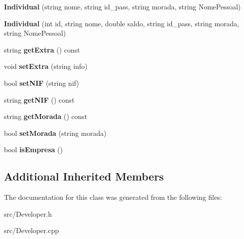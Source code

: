\begin{DoxyCompactItemize}
\item 
\hypertarget{class_individual_abb6c669a8218f6fc95d985f2219c7d2b}{{\bfseries Individual} (string nome, string id\+\_\+pass, string morada, string Nome\+Pessoal)}\label{class_individual_abb6c669a8218f6fc95d985f2219c7d2b}

\item 
\hypertarget{class_individual_adfda751f854c8687761fdd8f803096b2}{{\bfseries Individual} (int id, string nome, double saldo, string id\+\_\+pass, string morada, string Nome\+Pessoal)}\label{class_individual_adfda751f854c8687761fdd8f803096b2}

\item 
\hypertarget{class_individual_ace4ce273559198ae0e57ec1b93381eba}{string {\bfseries get\+Extra} () const }\label{class_individual_ace4ce273559198ae0e57ec1b93381eba}

\item 
\hypertarget{class_individual_a85830ece8fc5dcce9ae340d0d2f931f5}{void {\bfseries set\+Extra} (string info)}\label{class_individual_a85830ece8fc5dcce9ae340d0d2f931f5}

\item 
\hypertarget{class_individual_a3bcf8404908f826e5408a0ced5fceaac}{bool {\bfseries set\+N\+I\+F} (string nif)}\label{class_individual_a3bcf8404908f826e5408a0ced5fceaac}

\item 
\hypertarget{class_individual_a48b52345ec7fa4d62a2f2fbff5b871bf}{string {\bfseries get\+N\+I\+F} () const }\label{class_individual_a48b52345ec7fa4d62a2f2fbff5b871bf}

\item 
\hypertarget{class_individual_a4d909b32b36b7d6be19f222120a8ee22}{string {\bfseries get\+Morada} () const }\label{class_individual_a4d909b32b36b7d6be19f222120a8ee22}

\item 
\hypertarget{class_individual_afce84244dd6f49434d838a9264948ffb}{bool {\bfseries set\+Morada} (string morada)}\label{class_individual_afce84244dd6f49434d838a9264948ffb}

\item 
\hypertarget{class_individual_ae2705598212cf7aafb460b9a49d858cd}{bool {\bfseries is\+Empresa} ()}\label{class_individual_ae2705598212cf7aafb460b9a49d858cd}

\end{DoxyCompactItemize}
\subsection*{Additional Inherited Members}


The documentation for this class was generated from the following files\+:\begin{DoxyCompactItemize}
\item 
src/Developer.\+h\item 
src/Developer.\+cpp\end{DoxyCompactItemize}
